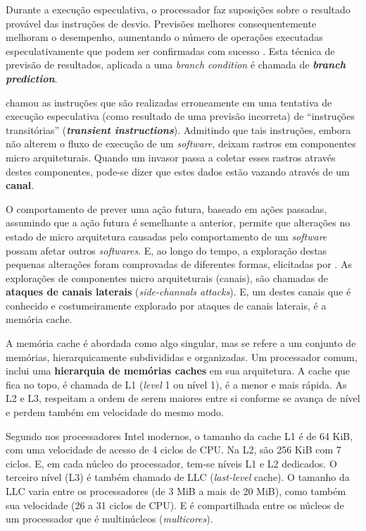 \documentclass[
	article,			    %
	12pt,				    %
	oneside,			    %
	a4paper,			    %
	chapter=TITLE,		    %
	section=TITLE,		    %
	subsection=TITLE,	    %
	english,			    %
	brazil,				    %
	sumario=tradicional
]{abntex2}
\begin{document}
Durante a execução especulativa, o processador faz suposições sobre o resultado provável das instruções de desvio. Previsões melhores consequentemente melhoram o desempenho, aumentando o número de operações executadas especulativamente que podem ser confirmadas com sucesso \cite{Kocher2018Spectre}. Esta técnica de previsão de resultados, aplicada a uma \emph{branch condition} é chamada de \textbf{\emph{branch prediction}}.

 chamou as instruções que são realizadas erroneamente em uma tentativa de execução especulativa (como resultado de uma previsão incorreta) de ``instruções transitórias'' (\textbf{\emph{transient instructions}}). Admitindo que tais instruções, embora não alterem o fluxo de execução de um \emph{software}, deixam rastros em componentes micro arquiteturais. Quando um invasor passa a coletar esses rastros através destes componentes, pode-se dizer que estes dados estão vazando através de um \textbf{canal}.

O comportamento de prever uma ação futura, baseado em ações passadas, assumindo que a ação futura é semelhante a anterior, permite que alterações no estado de micro arquitetura causadas pelo comportamento de um \emph{software} possam afetar outros \emph{softwares}. E, ao longo do tempo, a exploração destas pequenas alterações foram comprovadas de diferentes formas, elicitadas por . As explorações de componentes micro arquiteturais (canais), são chamadas de \textbf{ataques de canais laterais} (\emph{side-channals attacks}). E, um destes canais que é conhecido e costumeiramente explorado por ataques de canais laterais, é a memória cache.

A memória cache é abordada como algo singular, mas se refere a um conjunto de memórias, hierarquicamente subdivididas e organizadas. Um processador comum, inclui uma \textbf{hierarquia de memórias caches} em sua arquitetura. A cache que fica no topo, é chamada de L1 (\emph{level} 1 ou nível 1), é a menor e mais rápida. As L2 e L3, respeitam a ordem de serem maiores entre si conforme se avança de nível e perdem também em velocidade do mesmo modo.

Segundo  nos processadores Intel modernos, o tamanho da cache L1 é de 64 KiB, com uma velocidade de acesso de 4 ciclos de CPU. Na L2, são 256 KiB com 7 ciclos. E, em cada núcleo do processador, tem-se níveis L1 e L2 dedicados. O terceiro nível (L3) é também chamado de LLC (\emph{last-level} cache). O tamanho da LLC varia entre os processadores (de 3 MiB a mais de 20 MiB), como também sua velocidade (26 a 31 ciclos de CPU). E é compartilhada entre os núcleos de um processador que é multinúcleos (\emph{multicores}).
\end{document}
